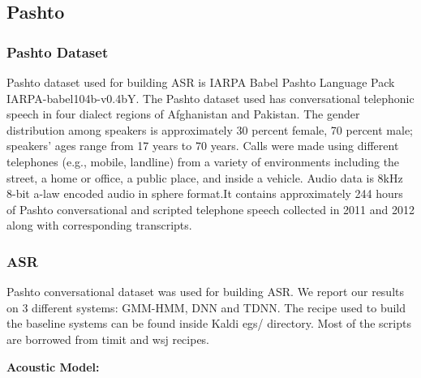 \documentclass[12pt]{article}
\begin{document}

\newpage
\subsection{Pashto}
\subsubsection{Pashto Dataset}
Pashto dataset used for building ASR is IARPA Babel Pashto Language Pack IARPA-babel104b-v0.4bY.
The Pashto dataset used has conversational telephonic speech in four dialect regions of Afghanistan and Pakistan. The gender distribution among speakers is approximately 30 percent female, 70 percent male; speakers' ages range from 17 years to 70 years. Calls were made using different telephones (e.g., mobile, landline) from a variety of environments including the street, a home or office, a public place, and inside a vehicle.
Audio data is 8kHz 8-bit a-law encoded audio in sphere format.It contains approximately 244 hours of Pashto conversational and scripted telephone speech collected in 2011 and 2012 along with corresponding transcripts.


\subsubsection{ASR}
Pashto conversational dataset was used for building ASR.
We report our results on 3 different systems: GMM-HMM, DNN and TDNN. The recipe used to build the baseline systems can be found inside Kaldi egs/ directory. Most of the scripts are borrowed from timit and wsj recipes.


\textbf{Acoustic Model:}
\end{document}
